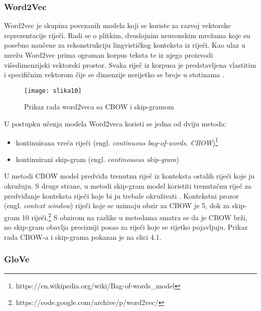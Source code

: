 \documentclass[times, utf8, zavrsni]{fer}
\begin{document}
\subsubsection{Word2Vec}

Word2vec je skupina povezanih modela koji se koriste za razvoj vektorske reprezentacije riječi. Radi se o plitkim, dvoslojnim neuronskim mrežama koje su posebno naučene za rekonstrukciju lingvističkog konteksta iz riječi. Kao ulaz u mrežu Word2vec prima ogroman korpus teksta te iz njega proizvodi višedimenzijski vektorski prostor. Svaka riječ iz korpusa je predstavljena vlastitim i specifičnim vektorom čije se dimenzije nerijetko se broje u stotinama \citep{word2vec}. \newline



\begin{figure}[h]
	\centering
	\texttt{[image: slika10]}
	\caption{Prikaz rada word2veca sa CBOW i skip-gramom \protect\footnotemark}
\end{figure}



U postupku učenja modela Word2veca koristi se jedna od dviju metoda:

\begin{itemize}
	\item kontinuirana vreća riječi (engl. \textit{continuous bag-of-words, CBOW})\footnote{https://en.wikipedia.org/wiki/Bag-of-words\_model}
	\item kontinuirani skip-gram (engl. \textit{continouous skip-gram})
\end{itemize}

	
U metodi CBOW model predviđa trenutnu riječ iz konteksta ostalih riječi koje ju okružuju. S druge strane, u metodi skip-gram model koristiti trenutačnu riječ za predviđanje konteksta riječi koje bi ju trebale okruživati \citep{word2vec2}. Kontekstni prozor (engl. \textit{context window}) riječi koje se uzimaju obzir za CBOW je 5, dok za skip-gram 10 riječi.\footnote{https://code.google.com/archive/p/word2vec/} S obzirom na razlike u metodama smatra se da je CBOW brži, no skip-gram obavlja precizniji posao za riječi koje se rijetko pojavljuju. Prikaz rada CBOW-a i skip-grama pokazan je na slici 4.1.




\subsubsection{GloVe}
\end{document}
